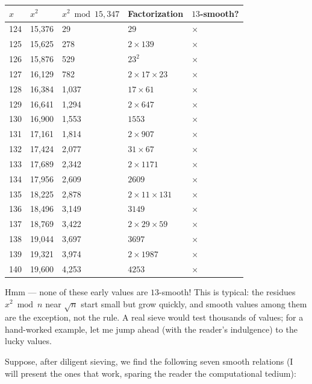 \begin{center}
\small
\begin{tabular}{lllll}
\toprule
$x$ & $x^2$ & $x^2 \bmod 15{,}347$ & Factorization & $13$-smooth? \\
\midrule
124 & 15,376 & 29 & $29$ & $\times$ \\
125 & 15,625 & 278 & $2 \times 139$ & $\times$ \\
126 & 15,876 & 529 & $23^2$ & $\times$ \\
127 & 16,129 & 782 & $2 \times 17 \times 23$ & $\times$ \\
128 & 16,384 & 1,037 & $17 \times 61$ & $\times$ \\
129 & 16,641 & 1,294 & $2 \times 647$ & $\times$ \\
130 & 16,900 & 1,553 & $1553$ & $\times$ \\
131 & 17,161 & 1,814 & $2 \times 907$ & $\times$ \\
132 & 17,424 & 2,077 & $31 \times 67$ & $\times$ \\
133 & 17,689 & 2,342 & $2 \times 1171$ & $\times$ \\
134 & 17,956 & 2,609 & $2609$ & $\times$ \\
135 & 18,225 & 2,878 & $2 \times 11 \times 131$ & $\times$ \\
136 & 18,496 & 3,149 & $3149$ & $\times$ \\
137 & 18,769 & 3,422 & $2 \times 29 \times 59$ & $\times$ \\
138 & 19,044 & 3,697 & $3697$ & $\times$ \\
139 & 19,321 & 3,974 & $2 \times 1987$ & $\times$ \\
140 & 19,600 & 4,253 & $4253$ & $\times$ \\
\bottomrule
\end{tabular}
\end{center}


Hmm --- none of these early values are $13$-smooth! This is typical: the residues $x^2 \bmod n$ near $\sqrt{n}$ start small but grow quickly, and smooth values among them are the exception, not the rule. A real sieve would test thousands of values; for a hand-worked example, let me jump ahead (with the reader's indulgence) to the lucky values.

Suppose, after diligent sieving, we find the following seven smooth relations (I will present the ones that work, sparing the reader the computational tedium):

